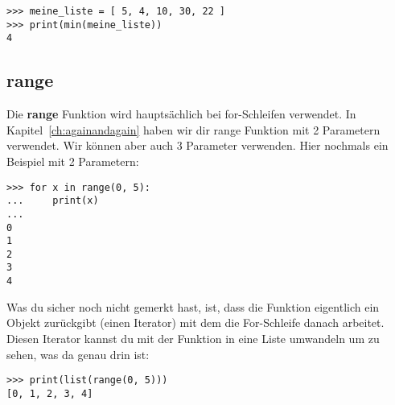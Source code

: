 \begin{Verbatim}[frame=single]
>>> meine_liste = [ 5, 4, 10, 30, 22 ]
>>> print(min(meine_liste))
4
\end{Verbatim}

\subsection*{range}

Die \textbf{range} Funktion wird hauptsächlich bei for-Schleifen verwendet. In Kapitel~\ref{ch:againandagain} haben wir dir range Funktion mit 2 Parametern verwendet. Wir können aber auch 3 Parameter verwenden. Hier nochmals ein Beispiel mit 2 Parametern:

\begin{Verbatim}[frame=single]
>>> for x in range(0, 5):
...     print(x)
...
0
1
2
3
4
\end{Verbatim}

\noindent
Was du sicher noch nicht gemerkt hast, ist, dass die  Funktion eigentlich ein Objekt zurückgibt (einen Iterator) mit dem die For-Schleife danach arbeitet. Diesen Iterator kannst du mit der  Funktion in eine Liste umwandeln um zu sehen, was da genau drin ist:

\begin{Verbatim}[frame=single]
>>> print(list(range(0, 5)))
[0, 1, 2, 3, 4]
\end{Verbatim}

